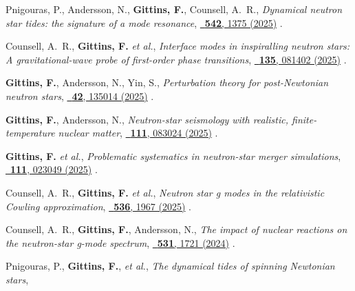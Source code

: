 \secstartswithlist{}%
\addtocounter{pubCounter}{-1}%
\begin{etaremune}[start=\value{pubCounter}]
    \renewcommand\labelenumi{[\theenumi]}
%
    \item Pnigouras, P., Andersson, N., \textbf{Gittins, F.}, Counsell, A.~R.,
    \textit{Dynamical neutron star tides: the signature of a mode resonance},
    \href{https://doi.org/10.1093/mnras/staf1285}%
    {\mnras\ \textbf{542}, 1375 (2025)}
    .
    \item Counsell, A.~R., \textbf{Gittins, F.} \textit{et al.},
    \textit{Interface modes in inspiralling neutron stars: A gravitational-wave
    probe of first-order phase transitions},
    \href{https://doi.org/10.1103/8hvq-6dy7}%
    {\prl\ \textbf{135}, 081402 (2025)}
    .
    \item \textbf{Gittins, F.}, Andersson, N., Yin, S.,
    \textit{Perturbation theory for post-Newtonian neutron stars},
    \href{https://doi.org/10.1088/1361-6382/ade83f}%
    {\cqg\ \textbf{42}, 135014 (2025)}
    .
    \item \textbf{Gittins, F.}, Andersson, N.,
    \textit{Neutron-star seismology with realistic, finite-temperature nuclear
    matter},
    \href{https://doi.org/10.1103/PhysRevD.111.083024}%
    {\prd\ \textbf{111}, 083024 (2025)}
    .
    \item \textbf{Gittins, F.} \textit{et al.},
    \textit{Problematic systematics in neutron-star merger simulations},
    \href{https://doi.org/10.1103/PhysRevD.111.023049}%
    {\prd\ \textbf{111}, 023049 (2025)}
    .
    \item Counsell, A.~R., \textbf{Gittins, F.} \textit{et al.},
    \textit{Neutron star g modes in the relativistic Cowling approximation},
    \href{https://doi.org/10.1093/mnras/stae2721}%
    {\mnras\ \textbf{536}, 1967 (2025)}
    .
    \item Counsell, A.~R., \textbf{Gittins, F.}, Andersson, N.,
    \textit{The impact of nuclear reactions on the neutron-star g-mode spectrum},
    \href{https://doi.org/10.1093/mnras/stae1242}%
    {\mnras\ \textbf{531}, 1721 (2024)}
    .
    \item Pnigouras, P., \textbf{Gittins, F.}, \textit{et al.},
    \textit{The dynamical tides of spinning Newtonian stars},

\end{etaremune}
